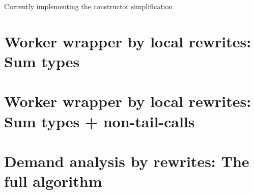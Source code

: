 \documentclass[sigplan,\review anonymous]{acmart}
\begin{document}
Currently implementing the constructor simplification

\section{Worker wrapper by local rewrites: Sum types}


\section{Worker wrapper by local rewrites: Sum types + non-tail-calls}


\section{Demand analysis by rewrites: The full algorithm}
\end{document}

